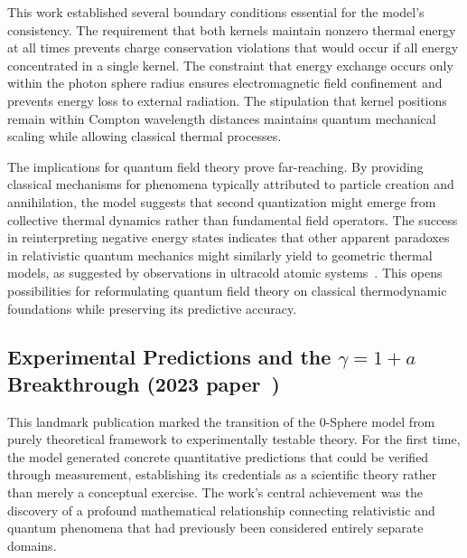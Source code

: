 \documentclass[%
 reprint,
 amsmath,amssymb,
 aps,
]{revtex4-1}
\numberwithin{equation}{section}%
\begin{document}
This work established several boundary conditions essential for the model's consistency. The requirement that both kernels maintain nonzero thermal energy at all times prevents charge conservation violations that would occur if all energy concentrated in a single kernel. The constraint that energy exchange occurs only within the photon sphere radius ensures electromagnetic field confinement and prevents energy loss to external radiation. The stipulation that kernel positions remain within Compton wavelength distances maintains quantum mechanical scaling while allowing classical thermal processes.

The implications for quantum field theory prove far-reaching. By providing classical mechanisms for phenomena typically attributed to particle creation and annihilation, the model suggests that second quantization might emerge from collective thermal dynamics rather than fundamental field operators. The success in reinterpreting negative energy states indicates that other apparent paradoxes in relativistic quantum mechanics might similarly yield to geometric thermal models, as suggested by observations in ultracold atomic systems~\cite{zhang2013}. This opens possibilities for reformulating quantum field theory on classical thermodynamic foundations while preserving its predictive accuracy.

\subsection{Experimental Predictions and the $\gamma = 1 + a$ Breakthrough (2023 paper~\cite{hanamura2309.0047})}

This landmark publication marked the transition of the 0-Sphere model from purely theoretical framework to experimentally testable theory. For the first time, the model generated concrete quantitative predictions that could be verified through measurement, establishing its credentials as a scientific theory rather than merely a conceptual exercise. The work's central achievement was the discovery of a profound mathematical relationship connecting relativistic and quantum phenomena that had previously been considered entirely separate domains.
\end{document}
